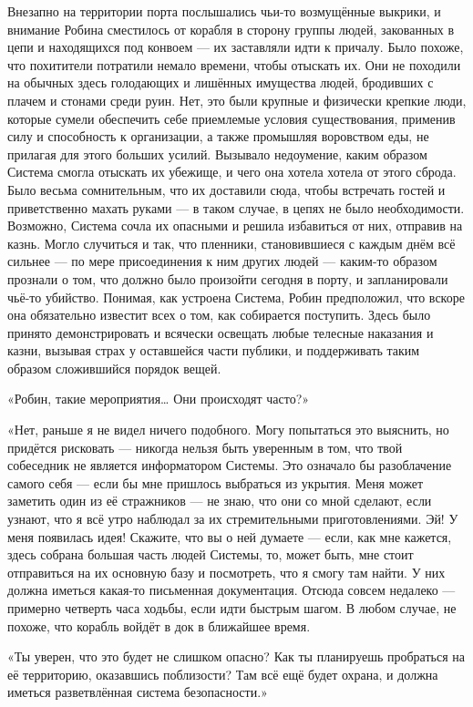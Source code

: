 \documentclass[a4paper,12pt]{book}
\begin{document}
Внезапно на территории порта послышались чьи-то возмущённые выкрики, и внимание Робина сместилось от корабля в сторону группы людей, закованных в цепи и находящихся под конвоем — их заставляли идти к причалу. Было похоже, что похитители потратили немало времени, чтобы отыскать их. Они не походили на обычных здесь голодающих и лишённых имущества людей, бродивших с плачем и стонами среди руин. Нет, это были крупные и физически крепкие люди, которые сумели обеспечить себе приемлемые условия существования, применив силу и способность к организации, а также промышляя воровством еды, не прилагая для этого больших усилий. Вызывало недоумение, каким образом Система смогла отыскать их убежище, и чего она хотела хотела от этого сброда. Было весьма сомнительным, что их доставили сюда, чтобы встречать гостей и приветственно махать руками — в таком случае, в цепях не было необходимости. Возможно, Система сочла их опасными и решила избавиться от них, отправив на казнь. Могло случиться и так, что пленники, становившиеся с каждым днём всё сильнее — по мере присоединения к ним других людей — каким-то образом прознали о том, что должно было произойти сегодня в порту, и запланировали чьё-то убийство. Понимая, как устроена Система, Робин предположил, что вскоре она обязательно известит всех о том, как собирается поступить. Здесь было принято демонстрировать и всячески освещать любые телесные наказания и казни, вызывая страх у оставшейся части публики, и поддерживать таким образом сложившийся порядок вещей.\\
\par
«Робин, такие мероприятия… Они происходят часто?»
\par
«Нет, раньше я не видел ничего подобного. Могу попытаться это выяснить, но придётся рисковать — никогда нельзя быть уверенным в том, что твой собеседник не является информатором Системы. Это означало бы разоблачение самого себя — если бы мне пришлось выбраться из укрытия. Меня может заметить один из её стражников — не знаю, что они со мной сделают, если узнают, что я всё утро наблюдал за их стремительными приготовлениями. Эй! У меня появилась идея! Скажите, что вы о ней думаете — если, как мне кажется, здесь собрана большая часть людей Системы, то, может быть, мне стоит отправиться на их основную базу и посмотреть, что я смогу там найти. У них должна иметься какая-то письменная документация. Отсюда совсем недалеко — примерно четверть часа ходьбы, если идти быстрым шагом. В любом случае, не похоже, что корабль войдёт в док в ближайшее время.
\par
«Ты уверен, что это будет не слишком опасно? Как ты планируешь пробраться на её территорию, оказавшись поблизости? Там всё ещё будет охрана, и должна иметься разветвлённая система безопасности.»
\end{document}
